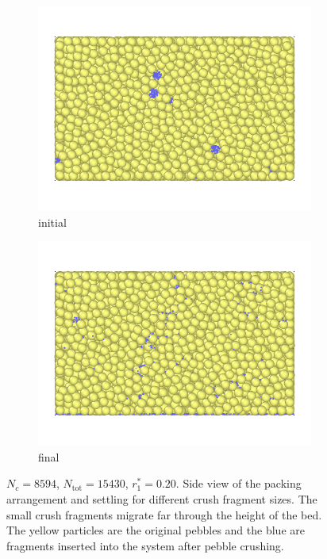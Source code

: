\begin{figure}[!ht]
	\centering
	\begin{subfigure}[b]{\doubleimagewidth}
		\centering
		\includegraphics[width=\textwidth]{chapters/figures/crush-fragments/0.20-1.png}
		\caption{initial}
	\end{subfigure}
	\begin{subfigure}[b]{\doubleimagewidth}
		\centering
		\includegraphics[width=\textwidth]{chapters/figures/crush-fragments/0.20-2.png}
		\caption{final}
	\end{subfigure}
	\caption{$N_c = 8594$, $N_\text{tot} = 15430$, $r_1^* = 0.20$. Side view of the packing arrangement and settling for different crush fragment sizes. The small crush fragments migrate far through the height of the bed. The yellow particles are the original pebbles and the blue are fragments inserted into the system after pebble crushing.}
\label{fig:crush-settling-pictures-1}
\end{figure}
